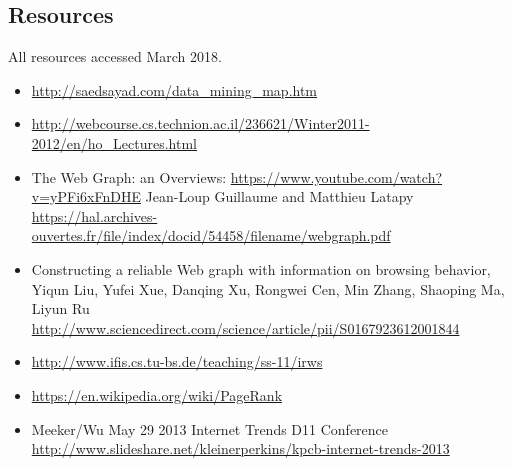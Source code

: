 \subsection{Resources}

All resources accessed March 2018.

\begin{itemize}

\item
  \url{http://saedsayad.com/data_mining_map.htm}
\item
  \url{http://webcourse.cs.technion.ac.il/236621/Winter2011-2012/en/ho_Lectures.html}
\item
  The Web Graph: an
  Overviews: \url{https://www.youtube.com/watch?v=yPFi6xFnDHE}
  Jean-Loup Guillaume and Matthieu Latapy
  \url{https://hal.archives-ouvertes.fr/file/index/docid/54458/filename/webgraph.pdf}
\item
  Constructing a reliable Web graph with information on browsing
  behavior, Yiqun Liu, Yufei Xue, Danqing Xu, Rongwei Cen, Min Zhang,
  Shaoping Ma, Liyun Ru
  \url{http://www.sciencedirect.com/science/article/pii/S0167923612001844}
\item
  \url{http://www.ifis.cs.tu-bs.de/teaching/ss-11/irws}
\item
  \url{https://en.wikipedia.org/wiki/PageRank}
\item
  Meeker/Wu May 29 2013 Internet Trends D11 Conference
  \url{http://www.slideshare.net/kleinerperkins/kpcb-internet-trends-2013}
\end{itemize}
